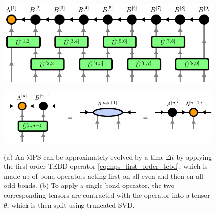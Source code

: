 \begin{figure}
	\centering
	\subcaptionbox{\label{fig:mps_tebd_first_order_overview}}
	{%
		\includegraphics[scale=1]{figures/tikz/Tensor_Networks/mps_TEBD/mps_TEBD_a.pdf}
	}
	\par\medskip
	\subcaptionbox{\label{fig:mps_tebd_first_order_applying_bond_op}}
	{%
		\includegraphics[scale=1]{figures/tikz/Tensor_Networks/mps_TEBD/mps_TEBD_b.pdf}
	}
	\caption{(a) An MPS can be approximately evolved by a time $\Delta t$ by applying the first order TEBD operator \eqref{eq:mps_first_order_tebd}, which is made up of bond operators acting first on all even and then on all odd bonds. (b) To apply a single bond operator, the two corresponding tensors are contracted with the operator into a tensor $\theta$, which is then split using truncated SVD.}
	\label{fig:mps_tebd_first_order}
\end{figure}